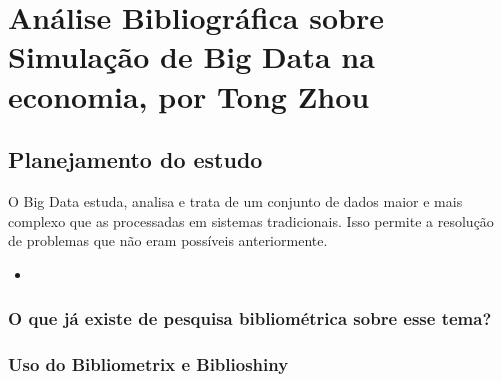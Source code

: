 \chapter{Análise Bibliográfica sobre Simulação de Big Data na economia, por Tong Zhou\label{chap:bibliometria:jhcf}}


\section{Planejamento do estudo}

O Big Data estuda, analisa e trata de um conjunto de dados maior e mais complexo que as processadas em sistemas tradicionais. Isso permite a resolução de problemas que não eram possíveis anteriormente.



\begin{itemize}
    \item 
\end{itemize}


\subsection{O que já existe de pesquisa bibliométrica sobre esse tema?}


\subsection{Uso do Bibliometrix e Biblioshiny}

